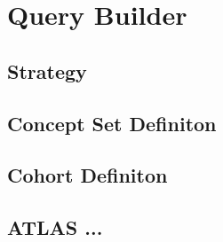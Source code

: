 \chapter{Query Builder}
\label{chapter:QueryBuilder}



\section{Strategy}





\section{Concept Set Definiton}



\section{Cohort Definiton}



\section{ATLAS ...}





